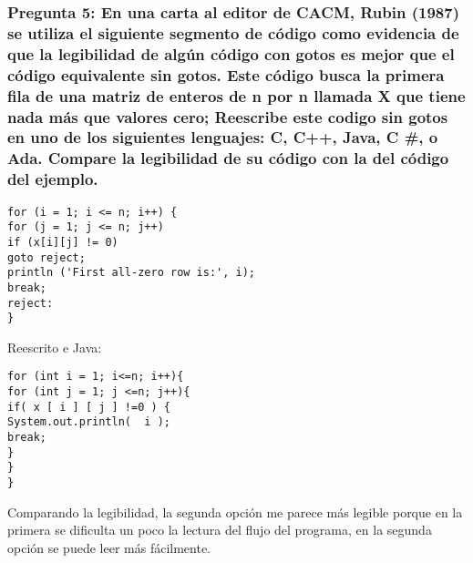 \subsubsection{Pregunta 5: En una carta al editor de CACM, Rubin (1987) se utiliza el siguiente segmento de código como evidencia de que la legibilidad de algún código con gotos es mejor que el código equivalente sin gotos. Este código busca la  primera fila de una matriz de enteros de n por n llamada X que  tiene nada más que valores cero; Reescribe este codigo sin gotos en uno de los siguientes lenguajes: C, C++, Java, C \#, o Ada. Compare la legibilidad de su código con la del código del ejemplo.
}

\lstset{language = C++} 
\begin{lstlisting}[frame = single] %Comienzo del Código
for (i = 1; i <= n; i++) {
for (j = 1; j <= n; j++)
if (x[i][j] != 0)
goto reject;
println ('First all-zero row is:', i);
break;
reject:
}

\end{lstlisting}

Reescrito e Java:\\

\lstset{language = C++} 
\begin{lstlisting}[frame = single] %Comienzo del Código
for (int i = 1; i<=n; i++){
for (int j = 1; j <=n; j++){
if( x [ i ] [ j ] !=0 ) {
System.out.println(  i );
break;
}
}
}
\end{lstlisting}

Comparando la legibilidad, la segunda opción me parece más legible porque en la primera se dificulta un poco la lectura del flujo del programa, en la segunda opción se puede leer más fácilmente.